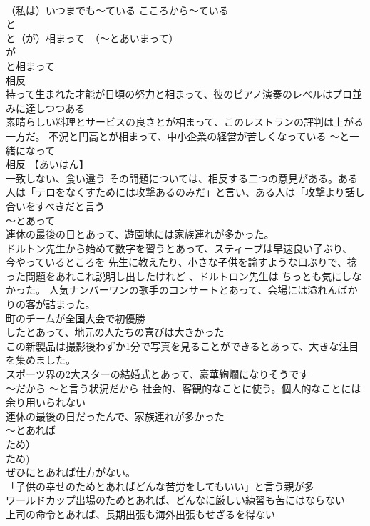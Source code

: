 \documentclass[8pt]{extreport}
\begin{document}
\begin{CJK}{UTF8}{min}
\\	（私は）いつまでも～ている こころから～ている 
\\	と
\\	と（が）相まって　（～とあいまって） 
\\	が
\\	と相まって 
\\	相反	
\\	持って生まれた才能が日頃の努力と相まって、彼のピアノ演奏のレベルはプロ並みに達しつつある
\\	素晴らしい料理とサービスの良さとが相まって、このレストランの評判は上がる一方だ。 不況と円高とが相まって、中小企業の経営が苦しくなっている	～と一緒になって 
\\	相反 【あいはん】　
\\	一致しない、食い違う その問題については、相反する二つの意見がある。ある人は「テロをなくすためには攻撃あるのみだ」と言い、ある人は「攻撃より話し合いをすべきだと言う
\\	～とあって 
\\	連休の最後の日とあって、遊園地には家族連れが多かった。 
\\	ドルトン先生から始めて数字を習うとあって、スティーブは早速良い子ぶり、 今やっているところを 先生に教えたり、小さな子供を諭すような口ぶりで、捻った問題をあれこれ説明し出したけれど 、ドルトロン先生は ちっとも気にしなかった。 人気ナンバーワンの歌手のコンサートとあって、会場には溢れんばかりの客が詰まった。
\\	町のチームが全国大会で初優勝
\\	したとあって、地元の人たちの喜びは大きかった 
\\	この新製品は撮影後わずか1分で写真を見ることができるとあって、大きな注目を集めました。 
\\	スポーツ界の2大スターの結婚式とあって、豪華絢爛になりそうです 
\\	～だから ～と言う状況だから 社会的、客観的なことに使う。個人的なことには余り用いられない 
\\	連休の最後の日だったんで、家族連れが多かった
\\	～とあれば 
\\	ため）	
\\	ため) 
\\	ぜひにとあれば仕方がない。 
\\	「子供の幸せのためとあればどんな苦労をしてもいい」と言う親が多 
\\	ワールドカップ出場のためとあれば、どんなに厳しい練習も苦にはならない
\\	上司の命令とあれば、長期出張も海外出張もせざるを得ない 

\end{CJK}
\end{document}
